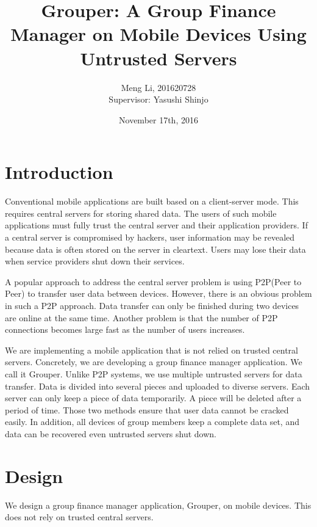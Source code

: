 \documentclass[twocolumn,10pt]{article}
\begin{document}
\date{November 17th, 2016}

\title{\bf Grouper: A Group Finance Manager on Mobile Devices Using Untrusted Servers}

\author{
	Meng Li, 201620728  
	\\ Supervisor: Yasushi Shinjo
}

\maketitle

\section{Introduction}
Conventional mobile applications are built based on a client-server mode. This requires central servers for storing shared data. The users of such mobile applications must fully trust the central server and their application providers. If a central server is compromised by hackers, user information may be revealed because data is often stored on the server in cleartext. Users may lose their data when service providers shut down their services. 

A popular approach to address the central server problem is using P2P(Peer to Peer) to transfer user data between devices. However, there is an obvious problem in such a P2P approach. Data transfer can only be finished during two devices are online at the same time. Another problem is that the number of P2P connections becomes large  fast as the number of users increases. 

We are implementing a mobile application that is not relied on trusted central servers. Concretely, we are developing a group finance manager application. We call it Grouper. Unlike P2P systems, we use multiple untrusted servers for data transfer. Data is divided into several pieces and uploaded to diverse servers. Each server can only keep a piece of data temporarily. A piece will be deleted after a period of time. Those two methods ensure that user data cannot be cracked easily. In addition, all devices of group members keep a complete data set, and data can be recovered even untrusted servers shut down.

\section{Design}

We design a group finance manager application, Grouper, on mobile devices. This does not rely on trusted central servers. 
\end{document}
